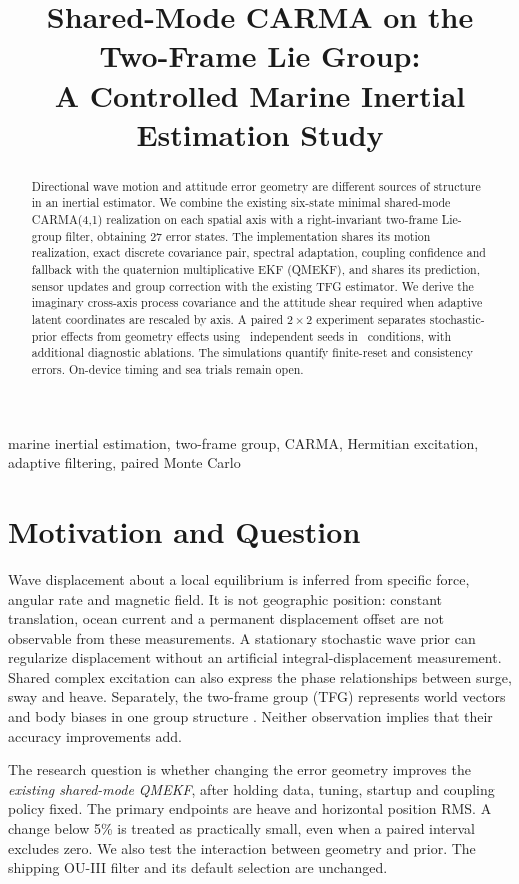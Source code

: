 \documentclass[conference]{IEEEtran}
\title{Shared-Mode CARMA on the Two-Frame Lie Group:\\A Controlled Marine Inertial Estimation Study}
\author{\IEEEauthorblockN{Mikhail S. Grushinskiy}
\IEEEauthorblockA{Independent Researcher, Fair Lawn, NJ, USA\\
Bareboat Necessities GitHub Project\\mgrouch@users.github.com}}
\begin{document}
\maketitle
\begin{abstract}
Directional wave motion and attitude error geometry are different sources of
structure in an inertial estimator. We combine the existing six-state minimal
shared-mode CARMA(4,1) realization on each spatial axis with a right-invariant
two-frame Lie-group filter, obtaining 27 error states. The implementation shares
its motion realization, exact discrete covariance pair, spectral adaptation,
coupling confidence and fallback with the quaternion multiplicative EKF (QMEKF),
and shares its prediction, sensor updates and group correction with the existing
TFG estimator. We derive the imaginary cross-axis process covariance and the
attitude shear required when adaptive latent coordinates are rescaled by axis.
A paired $2\times2$ experiment separates stochastic-prior effects from geometry
effects using \PrimarySeeds\ independent seeds in \ScenarioCount\ conditions,
with additional diagnostic ablations. \AbstractResults
The simulations quantify finite-reset and consistency errors. On-device
timing and sea trials remain open.
\end{abstract}
\begin{IEEEkeywords}marine inertial estimation, two-frame group, CARMA,
Hermitian excitation, adaptive filtering, paired Monte Carlo\end{IEEEkeywords}

\section{Motivation and Question}
Wave displacement about a local equilibrium is inferred from specific force,
angular rate and magnetic field. It is not geographic position: constant
translation, ocean current and a permanent displacement offset are not
observable from these measurements. A stationary stochastic wave prior can
regularize displacement without an artificial integral-displacement
measurement. Shared complex excitation can also express the phase relationships
between surge, sway and heave. Separately, the two-frame group (TFG) represents
world vectors and body biases in one group structure \cite{barrau}.
Neither observation implies that their accuracy improvements add.

The research question is whether changing the error geometry improves the
\emph{existing shared-mode QMEKF}, after holding data, tuning, startup and
coupling policy fixed. The primary endpoints are heave and horizontal position
RMS. A change below 5\% is treated as practically small, even when a paired
interval excludes zero. We also test the interaction between geometry and prior.
The shipping OU-III filter and its default selection are unchanged.
\end{document}

